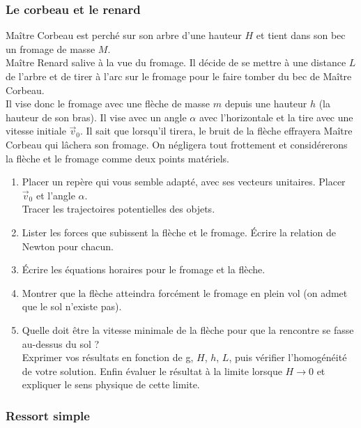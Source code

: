 \documentclass[a4paper,10pt,twoside]{article}
\begin{document}
\subsubsection{Le corbeau et le renard}
Maître Corbeau est perché sur son arbre d'une hauteur $H$ et tient dans son bec un fromage de masse $M$. \\
Maître Renard salive à la vue du fromage. Il décide de se mettre à une distance $L$ de l'arbre et de tirer à l'arc sur le fromage pour le faire tomber du bec de Maître Corbeau. \\
Il vise donc le fromage avec une flèche de masse $m$ depuis une hauteur $h$ (la hauteur de son bras). Il vise avec un angle $\alpha$ avec l'horizontale et la tire avec une vitesse initiale $\vec v_0 $.  Il sait que lorsqu'il tirera, le bruit de la flèche effrayera Maître Corbeau qui lâchera son fromage.
On négligera tout frottement et considérerons la flèche et le fromage comme deux points matériels.
\begin{enumerate}
    \item Placer un repère qui vous semble adapté, avec ses vecteurs unitaires. Placer $\vec v_0$ et l'angle $\alpha$. \\
    Tracer les trajectoires potentielles des objets.
    \item Lister les forces que subissent la flèche et le fromage. Écrire la relation de Newton pour chacun.
    \item Écrire les équations horaires pour le fromage et la flèche. 
    \item Montrer que la flèche atteindra forcément le fromage en plein vol (on admet que le sol n'existe pas).
    \item Quelle doit être la vitesse minimale de la flèche pour que la rencontre se fasse au-dessus du sol ? \\ Exprimer vos résultats en fonction de g, $H$, $h$, $L$, puis vérifier l'homogénéité de votre solution. Enfin évaluer le résultat à la limite lorsque $ H \longrightarrow 0$ et expliquer le sens physique de cette limite.
\end{enumerate}

\subsubsection{Ressort simple}

 
\end{document}
